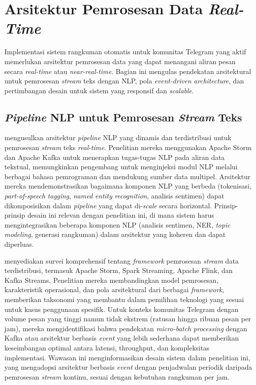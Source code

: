 \section{Arsitektur Pemrosesan Data \textit{Real-Time}}
\label{sec:realtime-architecture}

Implementasi sistem rangkuman otomatis untuk komunitas Telegram yang aktif memerlukan arsitektur pemrosesan data yang dapat menangani aliran pesan secara \textit{real-time} atau \textit{near-real-time}. Bagian ini mengulas pendekatan arsitektural untuk pemrosesan \textit{stream} teks dengan NLP, pola \textit{event-driven architecture}, dan pertimbangan desain untuk sistem yang responsif dan \textit{scalable}.

\subsection{\textit{Pipeline} NLP untuk Pemrosesan \textit{Stream} Teks}

\textcite{hamidi2021} mengusulkan arsitektur \textit{pipeline} NLP yang dinamis dan terdistribusi untuk pemrosesan \textit{stream} teks \textit{real-time}. Penelitian mereka menggunakan Apache Storm dan Apache Kafka untuk menerapkan tugas-tugas NLP pada aliran data tekstual, memungkinkan pengembang untuk menginjeksi modul NLP melalui berbagai bahasa pemrograman dan mendukung sumber data multipel. Arsitektur mereka mendemonstrasikan bagaimana komponen NLP yang berbeda (tokenisasi, \textit{part-of-speech tagging}, \textit{named entity recognition}, analisis sentimen) dapat dikomposisikan dalam \textit{pipeline} yang dapat di-\textit{scale} secara horizontal. Prinsip-prinsip desain ini relevan dengan penelitian ini, di mana sistem harus mengintegrasikan beberapa komponen NLP (analisis sentimen, NER, \textit{topic modeling}, generasi rangkuman) dalam arsitektur yang koheren dan dapat diperluas.

\textcite{isah2019} menyediakan survei komprehensif tentang \textit{framework} pemrosesan \textit{stream} data terdistribusi, termasuk Apache Storm, Spark Streaming, Apache Flink, dan Kafka Streams. Penelitian mereka membandingkan model pemrosesan, karakteristik operasional, dan pola arsitektural dari berbagai \textit{framework}, memberikan taksonomi yang membantu dalam pemilihan teknologi yang sesuai untuk kasus penggunaan spesifik. Untuk konteks komunitas Telegram dengan volume pesan yang tinggi namun tidak ekstrem (ratusan hingga ribuan pesan per jam), mereka mengidentifikasi bahwa pendekatan \textit{micro-batch processing} dengan Kafka atau arsitektur berbasis \textit{event} yang lebih sederhana dapat memberikan keseimbangan optimal antara latensi, throughput, dan kompleksitas implementasi. Wawasan ini menginformasikan desain sistem dalam penelitian ini, yang mengadopsi arsitektur berbasis \textit{event} dengan penjadwalan periodik daripada pemrosesan \textit{stream} kontinu, sesuai dengan kebutuhan rangkuman per jam.

